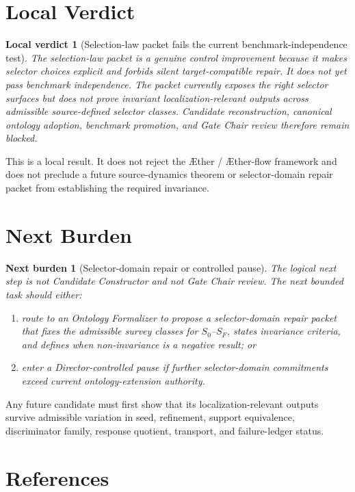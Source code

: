 \documentclass[11pt]{article}
\newcommand{\Aether}{\AE{}ther}
\newcommand{\Aflow}{\AE{}ther-flow}
\newcommand{\TheoryProgram}{\Aether{} / \Aflow{} framework}
\newtheorem{verdict}{Local verdict}
\newtheorem{nextburden}{Next burden}
\begin{document}
\section{Local Verdict}

\begin{verdict}[Selection-law packet fails the current benchmark-independence test]
The selection-law packet is a genuine control improvement because it makes
selector choices explicit and forbids silent target-compatible repair. It
does not yet pass benchmark independence. The packet currently exposes the
right selector surfaces but does not prove invariant localization-relevant
outputs across admissible source-defined selector classes. Candidate
reconstruction, canonical ontology adoption, benchmark promotion, and Gate
Chair review therefore remain blocked.
\end{verdict}

This is a local result. It does not reject the \TheoryProgram{} and does not
preclude a future source-dynamics theorem or selector-domain repair packet
from establishing the required invariance.

\section{Next Burden}

\begin{nextburden}[Selector-domain repair or controlled pause]
The logical next step is not Candidate Constructor and not Gate Chair review.
The next bounded task should either:
\begin{enumerate}
    \item route to an Ontology Formalizer to propose a selector-domain repair
    packet that fixes the admissible survey classes for \(S_0\)--\(S_F\),
    states invariance criteria, and defines when non-invariance is a negative
    result; or
    \item enter a Director-controlled pause if further selector-domain
    commitments exceed current ontology-extension authority.
\end{enumerate}
\end{nextburden}

Any future candidate must first show that its localization-relevant outputs
survive admissible variation in seed, refinement, support equivalence,
discriminator family, response quotient, transport, and failure-ledger status.

\section*{References}
\end{document}
